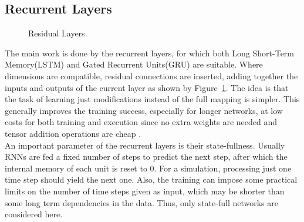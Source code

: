 \documentclass[sigconf]{acmart}
\begin{document}
\subsection{Recurrent Layers}
\begin{figure}
	\caption{Residual Layers.}
	\label{residualLayers}
\end{figure}
The main work is done by the recurrent layers, for which both Long Short-Term Memory(LSTM) and Gated Recurrent Units(GRU) are suitable. Where dimensions are compatible, residual connections are inserted, adding together the inputs and outputs of the current layer as shown by Figure~\ref{residualLayers}. The idea is that the task of learning just modifications instead of the full mapping is simpler. This generally improves the training success, especially for longer networks, at low costs for both training and execution since no extra weights are needed and tensor addition operations are cheap \cite{he2016deep}. \\
An important parameter of the recurrent layers is their state-fullness. Usually RNNs are fed a fixed number of steps to predict the next step, after which the internal memory of each unit is reset to $0$. For a simulation, processing just one time step should yield the next one. Also, the training can impose some practical limits on the number of time steps given as input, which may be shorter than some long term dependencies in the data. Thus, only state-full networks are considered here.
\end{document}
